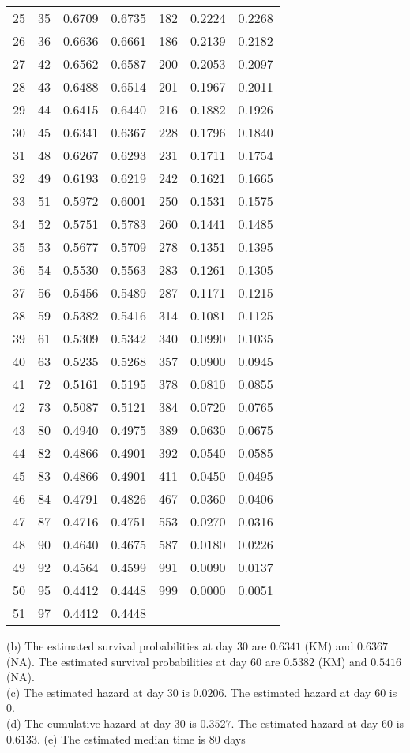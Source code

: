 \documentclass[11pt]{extarticle} %
\begin{document}
\begin{table}[H]
\begin{tabular}{rrrr||rrr}
  25 & 35 & 0.6709 & 0.6735 & 182 & 0.2224 & 0.2268 \\ 
  26 & 36 & 0.6636 & 0.6661 & 186 & 0.2139 & 0.2182 \\ 
  27 & 42 & 0.6562 & 0.6587 & 200 & 0.2053 & 0.2097 \\ 
  28 & 43 & 0.6488 & 0.6514 & 201 & 0.1967 & 0.2011 \\ 
  29 & 44 & 0.6415 & 0.6440 & 216 & 0.1882 & 0.1926 \\ 
  30 & 45 & 0.6341 & 0.6367 & 228 & 0.1796 & 0.1840 \\ 
  31 & 48 & 0.6267 & 0.6293 & 231 & 0.1711 & 0.1754 \\ 
  32 & 49 & 0.6193 & 0.6219 & 242 & 0.1621 & 0.1665 \\ 
  33 & 51 & 0.5972 & 0.6001 & 250 & 0.1531 & 0.1575 \\ 
  34 & 52 & 0.5751 & 0.5783 & 260 & 0.1441 & 0.1485 \\ 
  35 & 53 & 0.5677 & 0.5709 & 278 & 0.1351 & 0.1395 \\ 
  36 & 54 & 0.5530 & 0.5563 & 283 & 0.1261 & 0.1305 \\ 
  37 & 56 & 0.5456 & 0.5489 & 287 & 0.1171 & 0.1215 \\ 
  38 & 59 & 0.5382 & 0.5416 & 314 & 0.1081 & 0.1125 \\ 
  39 & 61 & 0.5309 & 0.5342 & 340 & 0.0990 & 0.1035 \\ 
  40 & 63 & 0.5235 & 0.5268 & 357 & 0.0900 & 0.0945 \\ 
  41 & 72 & 0.5161 & 0.5195 & 378 & 0.0810 & 0.0855 \\ 
  42 & 73 & 0.5087 & 0.5121 & 384 & 0.0720 & 0.0765 \\ 
  43 & 80 & 0.4940 & 0.4975 & 389 & 0.0630 & 0.0675 \\ 
  44 & 82 & 0.4866 & 0.4901 & 392 & 0.0540 & 0.0585 \\ 
  45 & 83 & 0.4866 & 0.4901 & 411 & 0.0450 & 0.0495 \\ 
  46 & 84 & 0.4791 & 0.4826 & 467 & 0.0360 & 0.0406 \\ 
  47 & 87 & 0.4716 & 0.4751 & 553 & 0.0270 & 0.0316 \\ 
  48 & 90 & 0.4640 & 0.4675 & 587 & 0.0180 & 0.0226 \\ 
  49 & 92 & 0.4564 & 0.4599 & 991 & 0.0090 & 0.0137 \\ 
  50 & 95 & 0.4412 & 0.4448 & 999 & 0.0000 & 0.0051 \\ 
  51 & 97 & 0.4412 & 0.4448 &  &  &  \\ 
   \hline
\end{tabular}
\end{table}
\noindent
(b) The estimated survival probabilities at day 30 are $0.6341$ (KM) and $0.6367$ (NA). The estimated survival probabilities at day 60 are $0.5382$ (KM) and $0.5416$ (NA).\\
\noindent
(c) The estimated hazard at day 30 is $0.0206$. The estimated hazard at day 60 is $0$. \\
\noindent
(d) The cumulative hazard at day 30 is $0.3527$. The estimated hazard at day 60 is $0.6133$.
\noindent
(e) The estimated median time is $80$ days
\end{document}
